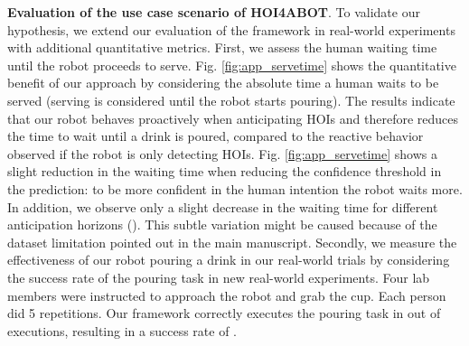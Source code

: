 \documentclass{article}
\begin{document}
\textbf{Evaluation of the use case scenario of HOI4ABOT}. 
To validate our hypothesis, we extend our evaluation of the framework in real-world experiments with additional quantitative metrics.  First, we assess the human waiting time until the robot proceeds to serve. Fig. \ref{fig:app_servetime} shows the quantitative benefit of our approach by considering the absolute time a human waits to be served (serving is considered until the robot starts pouring). The results indicate that our robot behaves proactively when anticipating HOIs and therefore reduces the time to wait until a drink is poured, compared to the reactive behavior observed if the robot is only detecting HOIs.  Fig. \ref{fig:app_servetime} shows a slight reduction in the waiting time when reducing the confidence threshold in the prediction: to be more confident in the human intention the robot waits more. In addition, we observe only a slight decrease in the waiting time for different anticipation horizons (). This subtle variation might be caused because of the dataset limitation pointed out in the main manuscript. Secondly, we measure the effectiveness of our robot pouring a drink in our real-world trials by considering the success rate of the pouring task in  new real-world experiments. Four lab members were instructed to approach the robot and grab the cup. Each person did 5 repetitions. Our framework correctly executes the pouring task in  out of  executions, resulting in a success rate of . 
\end{document}
